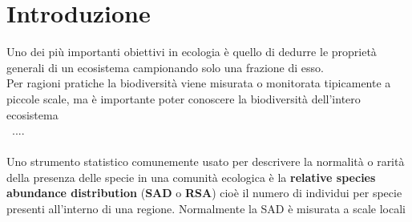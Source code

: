 \chapter*{Introduzione}
Uno dei più importanti obiettivi in ecologia è quello di dedurre le proprietà generali di un ecosistema campionando solo una frazione di esso. \\
Per ragioni pratiche la biodiversità viene misurata o monitorata tipicamente a piccole scale, ma è importante poter conoscere la biodiversità dell'intero ecosistema 
\\\
....
\\\\
Uno strumento statistico comunemente usato per descrivere la normalità o rarità della presenza delle specie in una comunità ecologica è la \textbf{relative species abundance distribution} (\textbf{SAD} o \textbf{RSA}) cioè il numero di individui per specie presenti all'interno di una regione. Normalmente la SAD è misurata a scale locali








%



           

